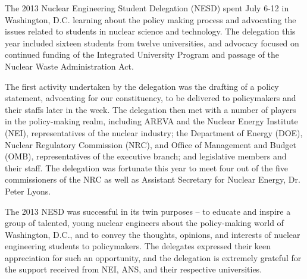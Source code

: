 The 2013 Nuclear Engineering Student Delegation (NESD) spent July 6-12 in
Washington, D.C. learning about the policy making process and advocating the
issues related to students in nuclear science and technology. The delegation
this year included sixteen students from twelve universities, and advocacy
focused on continued funding of the Integrated University Program and passage of
the Nuclear Waste Administration Act.

The first activity undertaken by the delegation was the drafting of a policy
statement, advocating for our constituency, to be delivered to policymakers and
their staffs later in the week. The delegation then met with a number of players
in the policy-making realm, including AREVA and the Nuclear Energy Institute
(NEI), representatives of the nuclear industry; the Department of Energy (DOE),
Nuclear Regulatory Commission (NRC), and Office of Management and Budget (OMB),
representatives of the executive branch; and legislative members and their
staff. The delegation was fortunate this year to meet four out of the five
commissioners of the NRC as well as Assistant Secretary for Nuclear Energy,
Dr. Peter Lyons.

The 2013 NESD was successful in its twin purposes -- to educate and inspire a
group of talented, young nuclear engineers about the policy-making world of
Washington, D.C., and to convey the thoughts, opinions, and interests of nuclear
engineering students to policymakers. The delegates expressed their keen
appreciation for such an opportunity, and the delegation is extremely grateful
for the support received from NEI, ANS, and their respective universities.
